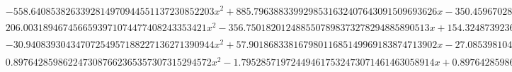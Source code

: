 \documentclass{article}
\begin{document}
\begin{landscape}
\begin{eqnarray*}
\begin{array}{cc}
\begin{array}{cc}
 -558.6408538263392814970944551137230852203 x^2+885.7963883399298531632407643091509693626 x-350.4596702820325945572378635878078530232 & x\geq \frac{3}{4}\land x<\frac{13}{16} \\
 206.0031894674566593971074477408243353421 x^2-356.7501820124885507898373278294885890513 x+154.3248739236373820487001113435144675824 & x\geq \frac{13}{16}\land x<\frac{7}{8} \\
 -30.94083930434707254957188227136271390944 x^2+57.90186833816798011685149969183874713902 x-27.08539810477485022297625069706624200083 & x\geq \frac{7}{8}\land x<\frac{15}{16} \\
 0.8976428598622473087662365357307315294572 x^2-1.795285719724494617532473071461463058914 x+0.8976428598622473087662365357307315294572 & x\geq \frac{15}{16}\land x<1
\end{array}


\end{array}
\end{eqnarray*}
\end{landscape}
\end{document}

